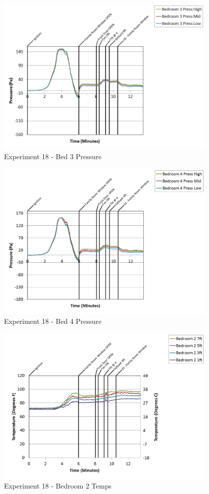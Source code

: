 \documentclass{article}
\begin{document}
\begin{appendices}
\begin{figure}[h!]
	\centering
	\includegraphics[height=3.05in]{0_Images/Results_Charts/Exp_18_Charts/Bed3Pressure.png}
	\caption{Experiment 18 - Bed 3 Pressure}
\end{figure}

\clearpage

\begin{figure}[h!]
	\centering
	\includegraphics[height=3.05in]{0_Images/Results_Charts/Exp_18_Charts/Bed4Pressure.png}
	\caption{Experiment 18 - Bed 4 Pressure}
\end{figure}


\begin{figure}[h!]
	\centering
	\includegraphics[height=3.05in]{0_Images/Results_Charts/Exp_18_Charts/Bedroom2Temps.png}
	\caption{Experiment 18 - Bedroom 2 Temps}
\end{figure}


\end{appendices}
\end{document}
